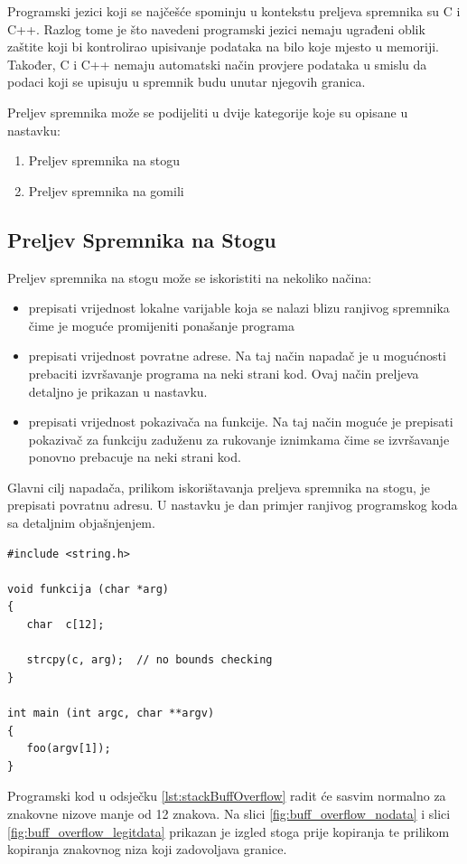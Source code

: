 \documentclass[times, utf8, diplomski, numeric]{fer}
\begin{document}
Programski jezici koji se najčešće spominju u kontekstu preljeva spremnika su C i C++. Razlog tome je što navedeni programski jezici nemaju ugrađeni oblik zaštite koji bi kontrolirao upisivanje podataka na bilo koje mjesto u memoriji. Također, C i C++ nemaju automatski način provjere podataka u smislu da podaci koji se upisuju u spremnik budu unutar njegovih granica.

Preljev spremnika može se podijeliti u dvije kategorije koje su opisane u nastavku:
\begin{enumerate}
\item Preljev spremnika na stogu
\item Preljev spremnika na gomili
\end{enumerate}

\subsection{Preljev Spremnika na Stogu}
Preljev spremnika na stogu može se iskoristiti na nekoliko načina:
\begin{itemize}
\item prepisati vrijednost lokalne varijable koja se nalazi blizu ranjivog spremnika čime je moguće promijeniti ponašanje programa
\item prepisati vrijednost povratne adrese. Na taj način napadač je u mogućnosti prebaciti izvršavanje programa na neki strani kod. Ovaj način preljeva detaljno je prikazan u nastavku.
\item prepisati vrijednost pokazivača na funkcije. Na taj način moguće je prepisati pokazivač za funkciju zaduženu za rukovanje iznimkama čime se izvršavanje ponovno prebacuje na neki strani kod.
\end{itemize}
Glavni cilj napadača, prilikom iskorištavanja preljeva spremnika na stogu, je prepisati povratnu adresu. U nastavku je dan primjer ranjivog programskog koda sa detaljnim objašnjenjem.

\begin{lstlisting}[frame=single, caption=Primjer preljeva spremnika na stogu, label={lst:stackBuffOverflow}]
#include <string.h>
 
void funkcija (char *arg)
{
   char  c[12];
 
   strcpy(c, arg);  // no bounds checking
}
 
int main (int argc, char **argv)
{
   foo(argv[1]);
}
\end{lstlisting}
Programski kod u odsječku \ref{lst:stackBuffOverflow} radit će sasvim normalno za znakovne nizove manje od 12 znakova. Na slici \ref{fig:buff_overflow_nodata} i slici \ref{fig:buff_overflow_legitdata} prikazan je izgled stoga prije kopiranja te prilikom kopiranja znakovnog niza koji zadovoljava granice.
\end{document}
